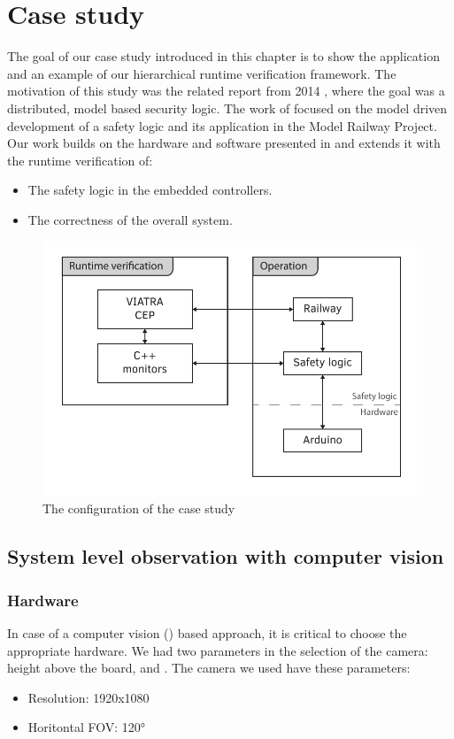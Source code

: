 \chapter{Case study}
\label{chap:case_study}

The goal of our case study introduced in this chapter is to show the application and an example of our hierarchical runtime verification framework. The motivation of this study was the related report from 2014 \citep{tdk2014}, where the goal was a distributed, model based security logic. The work of \citep{tdk2014} focused on the model driven development of a safety logic and its application in the Model Railway Project. Our work builds on the hardware and software presented in \citep{tdk2014} and extends it with the runtime verification of:
\begin{itemize}
	\item The safety logic in the embedded controllers.
	\item The correctness of the overall system.
\end{itemize}

\begin{figure}[h]
	\centering
	\includegraphics[width=0.65\linewidth]{include/figures/chapter_6/concept_1}
	\caption{The configuration of the case study}
	\label{fig:case_study:final_marker} 
\end{figure}

\section{System level observation with computer vision}

\subsection{Hardware}
\label{sec:case_study:hardware}

In case of a computer vision () based approach, it is critical to choose the appropriate hardware. We had two parameters in the selection of the camera: height above the board, and . The camera we used have these parameters:
\begin{itemize}
	\item Resolution: 1920x1080
	\item Horitontal FOV: \ang{120}
\end{itemize}

